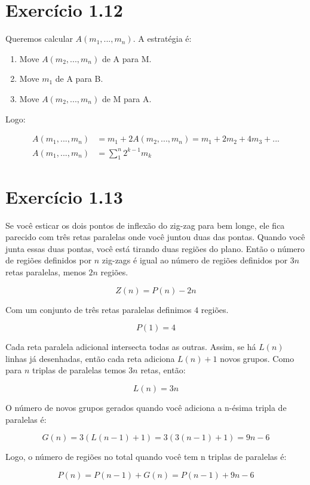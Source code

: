 \documentclass[10pt]{book}
\begin{document}
\section{  Exercício 1.12 }

Queremos calcular $A(m_1, ..., m_n)$. A estratégia é: 

\begin{enumerate}
  \item Move $A(m_2, ..., m_n)$ de A para M. 
  \item Move $m_1$ de A para B. 
  \item Move $A(m_2, ..., m_n)$ de M para A. 
\end{enumerate}

Logo: 

\begin{align*}
 A(m_1,...,m_n)&=m_1+2A(m_2,...,m_n)=m_1+2m_2+4m_3+...  \\
 A(m_1,...,m_n)&=\displaystyle\sum_1^n2^{k-1}m_k 
\end{align*} 

\section{  Exercício 1.13 }

 Se você esticar os dois pontos de inflexão do zig-zag para bem longe, ele fica parecido com três retas paralelas onde você juntou duas das pontas. Quando você junta essas duas pontas, você está tirando duas regiões do plano. Então o número de regiões definidos por $n$ zig-zags é igual ao número de regiões definidos por $3n$ retas paralelas, menos $2n$ regiões.

\[ Z(n)=P(n)-2n \]

 Com um conjunto de três retas paralelas definimos $4$ regiões. 

\[ P(1)=4\]

Cada reta paralela adicional intersecta todas as outras. Assim, se há $L(n)$ linhas já desenhadas, então cada reta adiciona $L(n)+1$ novos grupos. Como para $n$ triplas de paralelas temos $3n$ retas, então: 

\[  L(n)=3n \]

 O número de novos grupos gerados quando você adiciona a n-ésima tripla de paralelas é: 

\[ G(n)=3(L(n-1)+1)=3(3(n-1)+1)=9n-6 \]

Logo, o número de regiões no total quando você tem n triplas de paralelas é: 

\[ P(n)=P(n-1)+G(n)=P(n-1)+9n-6 \]
\end{document}

